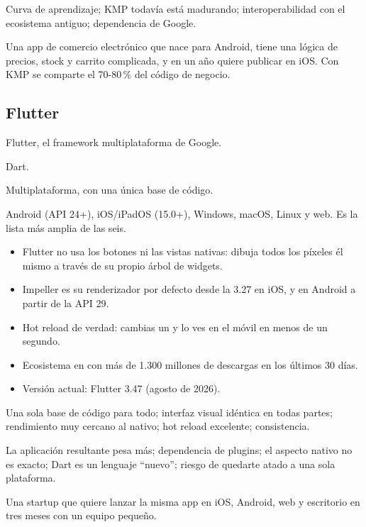  Curva de aprendizaje; KMP todavía está madurando; interoperabilidad con el ecosistema antiguo; dependencia de Google.

 Una app de comercio electrónico que nace para Android, tiene una lógica de precios, stock y carrito complicada, y en un año quiere publicar en iOS. Con KMP se comparte el 70-80\,\% del código de negocio.

\subsection{Flutter}

 Flutter, el framework multiplataforma de Google.

 Dart.

 Multiplataforma, con una única base de código.

 Android (API 24+), iOS/iPadOS (15.0+), Windows, macOS, Linux y web. Es la lista más amplia de las seis.

\begin{itemize}[leftmargin=*,itemsep=0.2em,topsep=0.2em]
  \item Flutter no usa los botones ni las vistas nativas: dibuja todos los píxeles él mismo a través de su propio árbol de widgets.
  \item Impeller es su renderizador por defecto desde la 3.27 en iOS, y en Android a partir de la API 29.
  \item Hot reload de verdad: cambias un  y lo ves en el móvil en menos de un segundo.
  \item Ecosistema en  con más de 1.300 millones de descargas en los últimos 30 días.
  \item Versión actual: Flutter 3.47 (agosto de 2026).
\end{itemize}

 Una sola base de código para todo; interfaz visual idéntica en todas partes; rendimiento muy cercano al nativo; hot reload excelente; consistencia.

 La aplicación resultante pesa más; dependencia de plugins; el aspecto nativo no es exacto; Dart es un lenguaje \enquote{nuevo}; riesgo de quedarte atado a una sola plataforma.

 Una startup que quiere lanzar la misma app en iOS, Android, web y escritorio en tres meses con un equipo pequeño.


